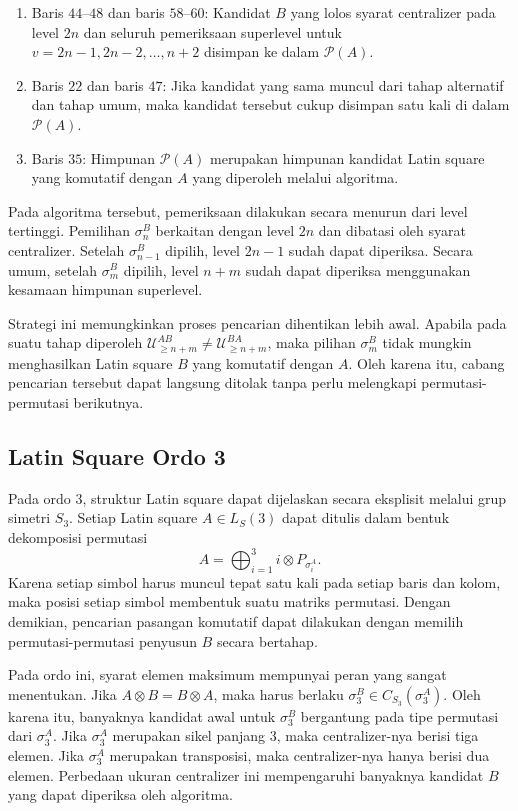 \begin{algoritma}
\begin{enumerate}
    \item Baris $44$--$48$ dan baris $58$--$60$: Kandidat $B$ yang lolos syarat centralizer pada level $2n$ dan seluruh pemeriksaan superlevel untuk $v=2n-1,2n-2,\ldots,n+2$ disimpan ke dalam $\mathcal{P}(A)$.

    \item Baris $22$ dan baris $47$: Jika kandidat yang sama muncul dari tahap alternatif dan tahap umum, maka kandidat tersebut cukup disimpan satu kali di dalam $\mathcal{P}(A)$.

    \item Baris $35$: Himpunan $\mathcal{P}(A)$ merupakan himpunan kandidat Latin square yang komutatif dengan $A$ yang diperoleh melalui algoritma.
  \end{enumerate}
\end{algoritma}

Pada algoritma tersebut, pemeriksaan dilakukan secara menurun dari level tertinggi. Pemilihan $\sigma_n^B$ berkaitan dengan level $2n$ dan dibatasi oleh syarat centralizer. Setelah $\sigma_{n-1}^B$ dipilih, level $2n-1$ sudah dapat diperiksa. Secara umum, setelah $\sigma_m^B$ dipilih, level $n+m$ sudah dapat diperiksa menggunakan kesamaan himpunan superlevel.

Strategi ini memungkinkan proses pencarian dihentikan lebih awal. Apabila pada suatu tahap diperoleh $\mathcal{U}_{\ge n+m}^{AB}\neq\mathcal{U}_{\ge n+m}^{BA}$, maka pilihan $\sigma_m^B$ tidak mungkin menghasilkan Latin square $B$ yang komutatif dengan $A$. Oleh karena itu, cabang pencarian tersebut dapat langsung ditolak tanpa perlu melengkapi permutasi-permutasi berikutnya.

\subsection{Latin Square Ordo 3}

Pada ordo $3$, struktur Latin square dapat dijelaskan secara eksplisit melalui grup simetri $S_3$. Setiap Latin square $A\in L_S(3)$ dapat ditulis dalam bentuk dekomposisi permutasi
\[
  A=\bigoplus_{i=1}^{3} i\otimes P_{\sigma_i^A}.
\]
Karena setiap simbol harus muncul tepat satu kali pada setiap baris dan kolom, maka posisi setiap simbol membentuk suatu matriks permutasi. Dengan demikian, pencarian pasangan komutatif dapat dilakukan dengan memilih permutasi-permutasi penyusun $B$ secara bertahap.

Pada ordo ini, syarat elemen maksimum mempunyai peran yang sangat menentukan. Jika $A\otimes B=B\otimes A$, maka harus berlaku $\sigma_3^B\in C_{S_3}(\sigma_3^A)$. Oleh karena itu, banyaknya kandidat awal untuk $\sigma_3^B$ bergantung pada tipe permutasi dari $\sigma_3^A$. Jika $\sigma_3^A$ merupakan sikel panjang $3$, maka centralizer-nya berisi tiga elemen. Jika $\sigma_3^A$ merupakan transposisi, maka centralizer-nya hanya berisi dua elemen. Perbedaan ukuran centralizer ini mempengaruhi banyaknya kandidat $B$ yang dapat diperiksa oleh algoritma.


